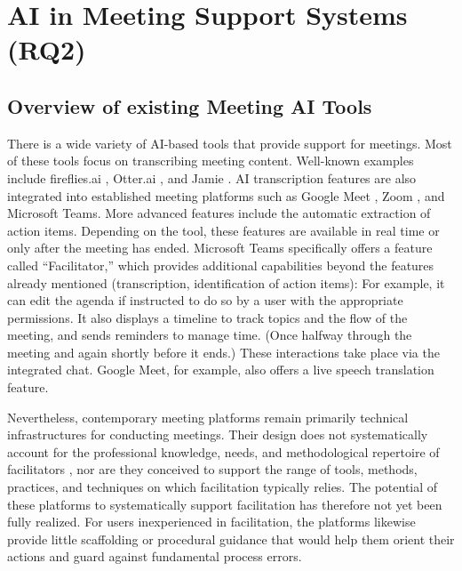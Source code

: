 \section{AI in Meeting Support Systems (RQ2)}

\subsection{Overview of existing Meeting AI Tools}
\label{sec:existing-meeting-ai-tools}
There is a wide variety of AI-based tools that provide support for meetings. Most of these tools focus on
transcribing meeting content. Well-known examples include fireflies.ai \cite{Firefliesai1AI}, Otter.ai
\cite{otteraiOtterMeetingAgent}, and Jamie \cite{jamieaiJamieYourPersonal}.
AI transcription features are also integrated into established meeting platforms such as Google Meet
\cite{workspaceGoogleMeetTelefon}, Zoom \cite{zoomKINotizentoolIhrKIMeetingAssistent},
and Microsoft Teams. \cite{microsoftVideokonferenzenBesprechungenAnrufe}
More advanced features include the automatic extraction of action items. Depending on the tool, these
features are available in real time or only after the meeting has ended.
Microsoft Teams specifically offers a feature called “Facilitator,” \cite{microsoftSetFacilitatorMicrosoft}
which provides additional capabilities beyond the features already mentioned (transcription, identification
of action items): For example, it can edit the agenda if instructed to do so by a user with the appropriate
permissions. It also displays a timeline to track topics and the flow of the meeting, and sends reminders to
manage time. (Once halfway through the meeting and again shortly before it ends.) These interactions take
place via the integrated chat.
Google Meet, for example, also offers a live speech translation feature. \cite{googleLearnSpeechTranslation}

Nevertheless, contemporary meeting platforms remain primarily technical infrastructures for conducting
meetings. Their design does not systematically account for the professional knowledge, needs, and
methodological repertoire of facilitators \cite{hughesKeeperSynchronousOnline2021}, nor are they conceived to
support the range of tools, methods, practices, and techniques on which facilitation typically relies.
The potential of these platforms to systematically support facilitation has therefore not yet been fully
realized.
For users inexperienced in facilitation, the platforms likewise provide little scaffolding or procedural
guidance that would help them orient their actions and guard against fundamental
process errors.

